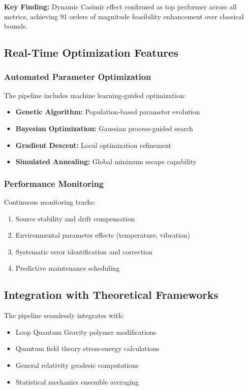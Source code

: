 \documentclass[11pt]{article}
\begin{document}
\textbf{Key Finding:} Dynamic Casimir effect confirmed as top performer across all metrics, achieving 91 orders of magnitude feasibility enhancement over classical bounds.

\subsection*{Real-Time Optimization Features}

\subsubsection*{Automated Parameter Optimization}
The pipeline includes machine learning-guided optimization:
\begin{itemize}
  \item \textbf{Genetic Algorithm:} Population-based parameter evolution
  \item \textbf{Bayesian Optimization:} Gaussian process-guided search
  \item \textbf{Gradient Descent:} Local optimization refinement
  \item \textbf{Simulated Annealing:} Global minimum escape capability
\end{itemize}

\subsubsection*{Performance Monitoring}
Continuous monitoring tracks:
\begin{enumerate}
  \item Source stability and drift compensation
  \item Environmental parameter effects (temperature, vibration)
  \item Systematic error identification and correction
  \item Predictive maintenance scheduling
\end{enumerate}

\subsection*{Integration with Theoretical Frameworks}

The pipeline seamlessly integrates with:
\begin{itemize}
  \item Loop Quantum Gravity polymer modifications
  \item Quantum field theory stress-energy calculations
  \item General relativity geodesic computations
  \item Statistical mechanics ensemble averaging
\end{itemize}
\end{document}

